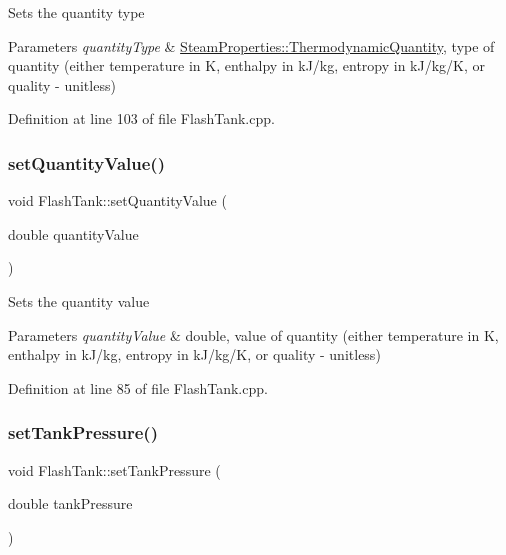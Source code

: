 Sets the quantity type 
\begin{DoxyParams}{Parameters}
{\em quantity\+Type} & \hyperlink{class_steam_properties_ae0294bedf7d178c2d8fb6aed0f62fbff}{Steam\+Properties\+::\+Thermodynamic\+Quantity}, type of quantity (either temperature in K, enthalpy in k\+J/kg, entropy in k\+J/kg/K, or quality -\/ unitless) \\
\hline
\end{DoxyParams}


Definition at line 103 of file Flash\+Tank.\+cpp.

\mbox{\label{class_flash_tank_ac7392743aeaf8de6ce368814ea42e236}} 
\subsubsection{\texorpdfstring{set\+Quantity\+Value()}{setQuantityValue()}}
{\footnotesize\ttfamily void Flash\+Tank\+::set\+Quantity\+Value (\begin{DoxyParamCaption}\item[{double}]{quantity\+Value }\end{DoxyParamCaption})}

Sets the quantity value 
\begin{DoxyParams}{Parameters}
{\em quantity\+Value} & double, value of quantity (either temperature in K, enthalpy in k\+J/kg, entropy in k\+J/kg/K, or quality -\/ unitless) \\
\hline
\end{DoxyParams}


Definition at line 85 of file Flash\+Tank.\+cpp.

\mbox{\label{class_flash_tank_a8b3bb51a62dac4f76284dfdc114d83fe}} 
\subsubsection{\texorpdfstring{set\+Tank\+Pressure()}{setTankPressure()}}
{\footnotesize\ttfamily void Flash\+Tank\+::set\+Tank\+Pressure (\begin{DoxyParamCaption}\item[{double}]{tank\+Pressure }\end{DoxyParamCaption})}

